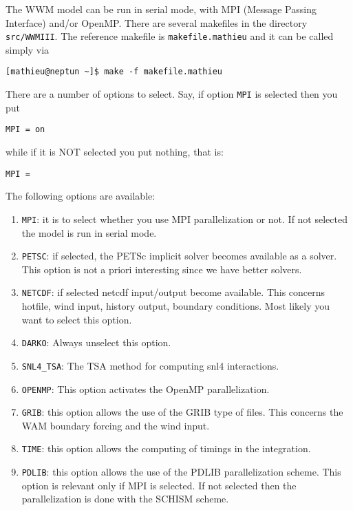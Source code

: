\documentclass[12pt]{amsart}
\begin{document}
The WWM model can be run in serial mode, with MPI (Message Passing Interface) and/or OpenMP.
There are several makefiles in the directory {\tt src/WWMIII}. The reference makefile is
{\tt makefile.mathieu} and it can be called simply via
\begin{verbatim}
[mathieu@neptun ~]$ make -f makefile.mathieu
\end{verbatim}

There are a number of options to select. Say, if option {\tt MPI} is selected then you put
\begin{verbatim}
MPI = on
\end{verbatim}
while if it is NOT selected you put nothing, that is:
\begin{verbatim}
MPI =
\end{verbatim}
The following options are available:
\begin{enumerate}
\item {\tt MPI}: it is to select whether you use MPI parallelization or not. If not selected the model is run in serial mode.
\item {\tt PETSC}: if selected, the PETSc implicit solver becomes available as a solver. This option is not a priori interesting since we have better solvers.
\item {\tt NETCDF}: if selected netcdf input/output become available. This concerns hotfile, wind input, history output, boundary conditions. Most likely you want to select this option.
\item {\tt DARKO}: Always unselect this option.
\item {\tt SNL4\_TSA}: The TSA method for computing snl4 interactions.
\item {\tt OPENMP}: This option activates the OpenMP parallelization.
\item {\tt GRIB}: this option allows the use of the GRIB type of files. This concerns the WAM boundary forcing and the wind input.
\item {\tt TIME}: this option allows the computing of timings in the integration.
\item {\tt PDLIB}: this option allows the use of the PDLIB parallelization scheme. This option is relevant only if MPI is selected. If not selected then the parallelization is done with the SCHISM scheme.
\end{enumerate}
\end{document}
